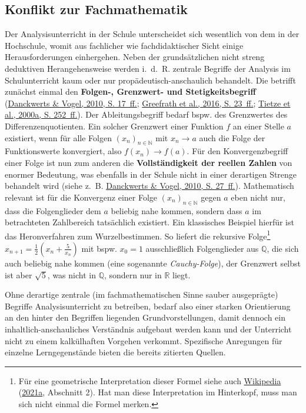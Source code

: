 \documentclass[
  ngerman,
]{scrbook}
\theoremstyle{definition}
\theoremstyle{definition}
\theoremstyle{definition}
\theoremstyle{definition}
\theoremstyle{remark}
\begin{document}
\hypertarget{konflikt-zur-fachmathematik}{%
\subsection{Konflikt zur Fachmathematik}\label{konflikt-zur-fachmathematik}}

Der Analysisunterricht in der Schule unterscheidet sich wesentlich von dem in der Hochschule, womit aus fachlicher wie fachdidaktischer Sicht einige Herausforderungen einhergehen. Neben der grundsätzlichen nicht streng deduktiven Herangehensweise werden i.~d.~R. zentrale Begriffe der Analysis im Schulunterricht kaum oder nur propädeutisch-anschaulich behandelt. Die betrifft zunächst einmal den \textbf{Folgen-, Grenzwert- und Stetigkeitsbegriff} (\protect\hyperlink{ref-Danckwerts2010}{Danckwerts \& Vogel, 2010, S. 17~ff.}; \protect\hyperlink{ref-Greefrath2016}{Greefrath et al., 2016, S. 23~ff.}; \protect\hyperlink{ref-Tietze:2000a}{Tietze et al., 2000a, S. 252~ff.}). Der Ableitungsbegriff bedarf bspw. des Grenzwertes des Differenzenquotienten. Ein solcher Grenzwert einer Funktion \(f\) an einer Stelle \(a\) existiert, wenn für alle Folgen \((x_n)_{n\in\mathbb{N}}\) mit \(x_n\rightarrow a\) auch die Folge der Funktionswerte konvergiert, also \(f(x_n)\rightarrow f(a)\). Für den Konvergenzbegriff einer Folge ist nun zum anderen die \textbf{Vollständigkeit der reellen Zahlen} von enormer Bedeutung, was ebenfalls in der Schule nicht in einer derartigen Strenge behandelt wird (siehe z.~B. \protect\hyperlink{ref-Danckwerts2010}{Danckwerts \& Vogel, 2010, S. 27~ff.}). Mathematisch relevant ist für die Konvergenz einer Folge \((x_n)_{n\in\mathbb{N}}\) gegen \(a\) eben nicht nur, dass die Folgenglieder dem \(a\) beliebig nahe kommen, sondern dass \(a\) im betrachteten Zahlbereich tatsächlich existiert. Ein klassisches Beispiel hierfür ist das Heronverfahren zum Wurzelbestimmen. So liefert die rekursive Folge\footnote{Für eine geometrische Interpretation dieser Formel siehe auch \protect\hyperlink{ref-dewiki:216870314}{Wikipedia} (\protect\hyperlink{ref-dewiki:216870314}{2021a}, Abschnitt 2). Hat man diese Interpretation im Hinterkopf, muss man sich nicht einmal die Formel merken.} \(x_{n+1} = \frac{1}{2}\left(x_n + \frac{5}{x_n}\right)\) mit bspw. \(x_0 = 1\) ausschließlich Folgenglieder aus \(\mathbb{Q}\), die sich auch beliebig nahe kommen (eine sogenannte \emph{Cauchy-Folge}), der Grenzwert selbst ist aber \(\sqrt{5}\), was nicht in \(\mathbb{Q}\), sondern nur in \(\mathbb{R}\) liegt.

Ohne derartige zentrale (im fachmathematischen Sinne sauber ausgeprägte) Begriffe Analysisunterricht zu betreiben, bedarf also einer starken Orientierung an den hinter den Begriffen liegenden Grundvorstellungen, damit dennoch ein inhaltlich-anschauliches Verständnis aufgebaut werden kann und der Unterricht nicht zu einem kalkülhaften Vorgehen verkommt. Spezifische Anregungen für einzelne Lerngegenstände bieten die bereits zitierten Quellen.
\end{document}

